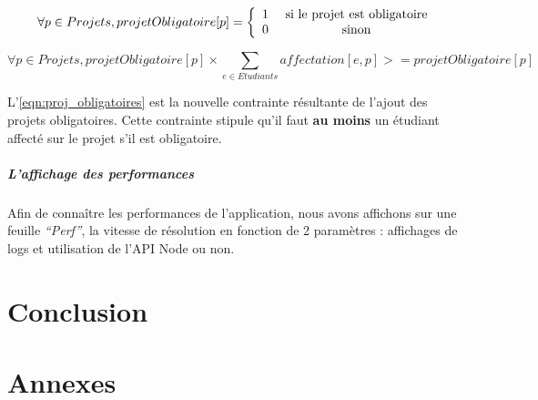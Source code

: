 \documentclass[final,poster]{polytech/polytech}
\begin{document}
\begin{equation}
\forall {p \in Projets}, projetObligatoire[p]=
\left\lbrace
\begin{array}{c c }
1 & \text{ si le projet est obligatoire} \\
0 & \text{ sinon}
\end{array}
\right.
\label{eqn:projet_oblig_def}
\end{equation}

\begin{equation}
\forall {p \in Projets}, projetObligatoire[p]\times\sum_{e \in Etudiants} affectation[e,p] >=projetObligatoire[p]
\label{eqn:proj_obligatoires}
\end{equation}


L'\autoref{eqn:proj_obligatoires} est la nouvelle contrainte résultante de l'ajout des projets obligatoires. Cette contrainte stipule qu'il faut \textbf{au moins} un étudiant affecté sur le projet s'il est obligatoire.

\paragraph{L'affichage des performances}
Afin de connaître les performances de l'application, nous avons affichons sur une feuille \textit{“Perf”}, la vitesse de résolution en fonction de 2 paramètres : affichages de logs et utilisation de l’API Node ou non.




\chapter*{Conclusion}



\chapter*{Annexes}

\end{document}
